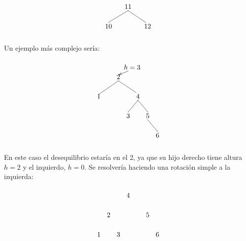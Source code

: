 \documentclass[10pt,a4paper,spanish]{report}
\begin{document}
\begin{description}
	\[\begin{xy}
	,(0,0)*+=<10mm>[]\txt<2cm>{11}
	,(-10,-10)*+=<10mm>[]\txt<2cm>{10}
	,(10,-10)*+=<10mm>[]\txt<2cm>{12}

	\ar@{-} (0,-2);(9,-8) %
	\ar@{-} (0,-2);(-10,-8)
	\end{xy}\]

	\noindent
	Un ejemplo más complejo sería:
	\[\begin{xy}
	,(0,0)*+=<10mm>[]\txt<2cm>{2}
	,(7,5)*+=<10mm>[]\txt<2cm>{$h=3$}
	,(-10,-10)*+=<10mm>[]\txt<2cm>{1}
	,(10,-10)*+=<10mm>[]\txt<2cm>{4}
	,(5,-20)*+=<10mm>[]\txt<2cm>{3}
	,(15,-20)*+=<10mm>[]\txt<2cm>{5}
	,(20,-30)*+=<10mm>[]\txt<2cm>{6}

	\ar@{->} (5,3);(0,1)
	\ar@{-} (0,-2);(-10,-9) %
	\ar@{-} (0,-2);(9,-8) %
	\ar@{-} (10,-12);(5,-18) %
	\ar@{-} (10,-12);(15,-18) %
	\ar@{-} (15,-22);(20,-28)
	\end{xy}\]

	\noindent
	En este caso el desequilibrio estaría en el 2, ya que su hijo derecho tiene altura $h=2$ y el izquierdo, $h=0$. Se resolvería haciendo una rotación simple a la izquierda:
	\[\begin{xy}
	,(0,0)*+=<10mm>[]\txt<2cm>{4}
	,(-10,-10)*+=<10mm>[]\txt<2cm>{2}
	,(10,-10)*+=<10mm>[]\txt<2cm>{5}
	,(-15,-20)*+=<10mm>[]\txt<2cm>{1}
	,(-5,-20)*+=<10mm>[]\txt<2cm>{3}
	,(15,-20)*+=<10mm>[]\txt<2cm>{6}


\end{xy}\]
\end{description}
\end{document}

